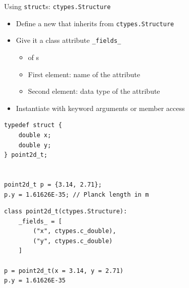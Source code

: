 
\begin{frame}[fragile]{Using \texttt{struct}s: \texttt{ctypes.Structure}}
%
\begin{itemize}
\item Define a new  that inherits from \texttt{ctypes.Structure}
\item Give it a class attribute \texttt{\_fields\_}
	\begin{itemize}
	\item {} of s
	\item First  element: name of the attribute
	\item Second  element: data type of the attribute
	\end{itemize}
\item Instantiate with keyword arguments or member access
\end{itemize}
%
\begin{tcbraster}[raster columns=2,
                  raster equal height,
                  nobeforeafter,
                  raster column skip=0.2cm]
\begin{codebox}[C struct]
\begin{verbatim}
typedef struct {
    double x;
    double y;
} point2d_t;


point2d_t p = {3.14, 2.71};
p.y = 1.61626E-35; // Planck length in m
\end{verbatim}
\end{codebox}
%
%
\begin{codebox}
\begin{verbatim}
class point2d_t(ctypes.Structure):
    _fields_ = [
        ("x", ctypes.c_double),
        ("y", ctypes.c_double)
    ]

p = point2d_t(x = 3.14, y = 2.71)
p.y = 1.61626E-35
\end{verbatim}
\end{codebox}
\end{tcbraster}
%
\end{frame}


